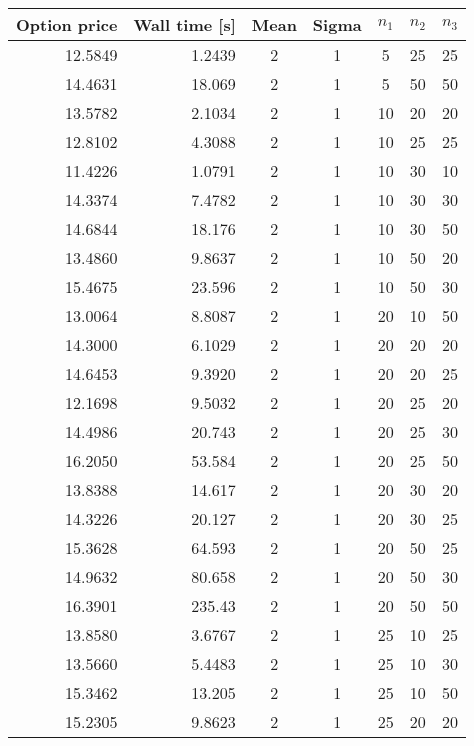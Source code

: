 \documentclass[11pt]{article}
\begin{document}
  \begin{center}
\begin{longtable}{rrccccc}%
      \textbf{Option price} & \textbf{Wall time [s]} & \textbf{Mean} & \textbf{Sigma} & $n_1$ & $n_2$ & $n_3$ \\
      \hline
12.5849    & 1.2439   &  2 & 1 &  5  & 25 & 25 	\\ 
14.4631    & 18.069   &  2 & 1 &  5  & 50 & 50 	\\ 
13.5782    & 2.1034   &  2 & 1 &  10 & 20 & 20	\\ 
12.8102    & 4.3088   &  2 & 1 &  10 & 25 & 25	\\ 
11.4226    & 1.0791   &  2 & 1 &  10 & 30 & 10	\\ 
14.3374    & 7.4782   &  2 & 1 &  10 & 30 & 30	\\ 
14.6844    & 18.176   &  2 & 1 &  10 & 30 & 50	\\ 
13.4860    & 9.8637   &  2 & 1 &  10 & 50 & 20	\\ 
15.4675    & 23.596   &  2 & 1 &  10 & 50 & 30	\\ 
13.0064    & 8.8087   &  2 & 1 &  20 & 10 & 50	\\ 
14.3000    & 6.1029   &  2 & 1 &  20 & 20 & 20	\\ 
14.6453    & 9.3920   &  2 & 1 &  20 & 20 & 25	\\ 
12.1698    & 9.5032   &  2 & 1 &  20 & 25 & 20	\\ 
14.4986    & 20.743   &  2 & 1 &  20 & 25 & 30	\\ 
16.2050    & 53.584   &  2 & 1 &  20 & 25 & 50	\\ 
13.8388    & 14.617   &  2 & 1 &  20 & 30 & 20	\\ 
14.3226    & 20.127   &  2 & 1 &  20 & 30 & 25	\\ 
15.3628    & 64.593   &  2 & 1 &  20 & 50 & 25	\\ 
14.9632    & 80.658   &  2 & 1 &  20 & 50 & 30	\\ 
16.3901    & 235.43   &  2 & 1 &  20 & 50 & 50	\\ 
13.8580    & 3.6767   &  2 & 1 &  25 & 10 & 25	\\ 
13.5660    & 5.4483   &  2 & 1 &  25 & 10 & 30	\\ 
15.3462    & 13.205   &  2 & 1 &  25 & 10 & 50	\\ 
15.2305    & 9.8623   &  2 & 1 &  25 & 20 & 20	\\ 

\end{longtable}
\end{center}
\end{document}
